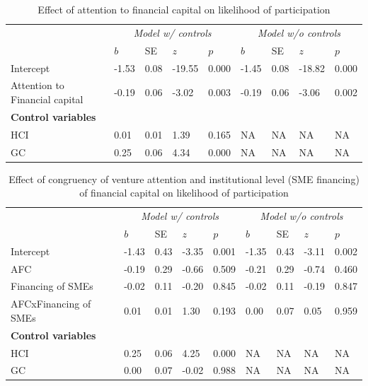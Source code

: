 \documentclass[
  english,
  man]{apa6}
\begin{document}
\begin{table}

\caption{\label{tab:unnamed-chunk-18}Effect of attention to financial capital on likelihood of participation}
\centering
\begin{tabular}[t]{l|l|l|l|l|l|l|l|l}
\hline
\multicolumn{1}{c|}{\em{ }} & \multicolumn{4}{c|}{\em{Model w/ controls}} & \multicolumn{4}{c}{\em{Model w/o controls}} \\
\cline{2-5} \cline{6-9}
  & $b$ & SE & $z$ & $p$ & $b$ & SE & $z$ & $p$\\
\hline
Intercept & -1.53 & 0.08 & -19.55 & 0.000 & -1.45 & 0.08 & -18.82 & 0.000\\
\hline
Attention to Financial capital & -0.19 & 0.06 & -3.02 & 0.003 & -0.19 & 0.06 & -3.06 & 0.002\\
\hline
\multicolumn{9}{l}{\textbf{Control variables}}\\
\hline
\hspace{1em}HCI & 0.01 & 0.01 & 1.39 & 0.165 & NA & NA & NA & NA\\
\hline
\hspace{1em}GC & 0.25 & 0.06 & 4.34 & 0.000 & NA & NA & NA & NA\\
\hline
\end{tabular}
\end{table}

\begin{table}

\caption{\label{tab:unnamed-chunk-18}Effect of congruency of venture attention and institutional level (SME financing) of financial capital on likelihood of participation}
\centering
\begin{tabular}[t]{l|l|l|l|l|l|l|l|l}
\hline
\multicolumn{1}{c|}{\em{ }} & \multicolumn{4}{c|}{\em{Model w/ controls}} & \multicolumn{4}{c}{\em{Model w/o controls}} \\
\cline{2-5} \cline{6-9}
  & $b$ & SE & $z$ & $p$ & $b$ & SE & $z$ & $p$\\
\hline
Intercept & -1.43 & 0.43 & -3.35 & 0.001 & -1.35 & 0.43 & -3.11 & 0.002\\
\hline
AFC & -0.19 & 0.29 & -0.66 & 0.509 & -0.21 & 0.29 & -0.74 & 0.460\\
\hline
Financing of SMEs & -0.02 & 0.11 & -0.20 & 0.845 & -0.02 & 0.11 & -0.19 & 0.847\\
\hline
AFCxFinancing of SMEs & 0.01 & 0.01 & 1.30 & 0.193 & 0.00 & 0.07 & 0.05 & 0.959\\
\hline
\multicolumn{9}{l}{\textbf{Control variables}}\\
\hline
\hspace{1em}HCI & 0.25 & 0.06 & 4.25 & 0.000 & NA & NA & NA & NA\\
\hline
\hspace{1em}GC & 0.00 & 0.07 & -0.02 & 0.988 & NA & NA & NA & NA\\
\hline
\end{tabular}
\end{table}
\end{document}
